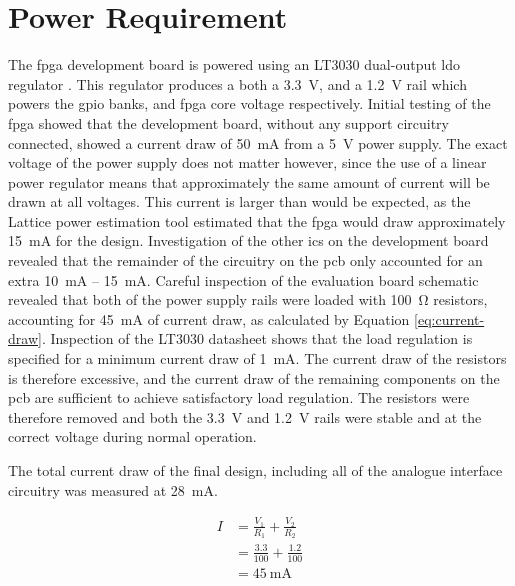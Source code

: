 \section{Power Requirement} \label{sec:power requirement}
The \gls{fpga} development board is powered using an LT3030 dual-output \gls{ldo} regulator \cite{lattice2017b}. This regulator produces a both a \SI{3.3}{\volt}, and a \SI{1.2}{\volt} rail which powers the \gls{gpio} banks, and \gls{fpga} core voltage respectively. Initial testing of the \gls{fpga} showed that the development board, without any support circuitry connected, showed a current draw of \SI{50}{\milli\ampere} from a \SI{5}{\volt} power supply. The exact voltage of the power supply does not matter however, since the use of a linear power regulator means that approximately the same amount of current will be drawn at all voltages. This current is larger than would be expected, as the Lattice power estimation tool estimated that the \gls{fpga} would draw approximately \SI{15}{\milli\ampere} for the design. Investigation of the other \glspl{ic} on the development board revealed that the remainder of the circuitry on the \gls{pcb} only accounted for an extra \SI{10}{\milli\ampere} -- \SI{15}{\milli\ampere}. Careful inspection of the evaluation board schematic revealed that both of the power supply rails were loaded with \SI{100}{\ohm} resistors, accounting for \SI{45}{\milli\ampere} of current draw, as calculated by Equation \ref{eq:current-draw}. Inspection of the LT3030 datasheet shows that the load regulation is specified for a minimum current draw of \SI{1}{\milli\ampere}. The current draw of the resistors is therefore excessive, and the current draw of the remaining components on the \gls{pcb} are sufficient to achieve satisfactory load regulation. The resistors were therefore removed and both the \SI{3.3}{\volt} and \SI{1.2}{\volt} rails were stable and at the correct voltage during normal operation.


\newcommand{\delayLineCurrentMa}{28}

The total current draw of the final design, including all of the analogue interface circuitry was measured at \SI{\delayLineCurrentMa}{\milli\ampere}.

\begin{align}
I &= \frac{V_1}{R_1} + \frac{V_2}{R_2} \nonumber \\
&= \frac{3.3}{100} + \frac{1.2}{100} \nonumber \\
&= \SI{45}{\milli\ampere} \label{eq:current-draw}
\end{align}

